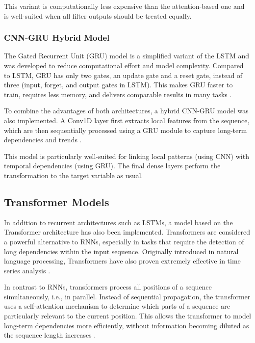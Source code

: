 This variant is computationally less expensive than the attention-based one and is well-suited when all filter outputs should be treated equally.



\subsubsection{CNN-GRU Hybrid Model}

The Gated Recurrent Unit (GRU) model is a simplified variant of the LSTM and was developed to reduce computational effort and model complexity.
Compared to LSTM, GRU has only two gates, an update gate and a reset gate, instead of three (input, forget, and output gates in LSTM).
This makes GRU faster to train, requires less memory, and delivers comparable results in many tasks \cite{gru-basics}.

To combine the advantages of both architectures, a hybrid CNN-GRU model was also implemented.
A Conv1D layer first extracts local features from the sequence, which are then sequentially processed using a GRU module to capture long-term dependencies and trends \cite{cnn-gru}.

This model is particularly well-suited for linking local patterns (using CNN) with temporal dependencies (using GRU).
The final dense layers perform the transformation to the target variable as usual.



\subsection{Transformer Models}

In addition to recurrent architectures such as LSTMs, a model based on the Transformer architecture has also been implemented.
Transformers are considered a powerful alternative to RNNs, especially in tasks that require the detection of long dependencies within the input sequence.
Originally introduced in natural language processing, Transformers have also proven extremely effective in time series analysis \cite{transformer-time-series}.

In contrast to RNNs, transformers process all positions of a sequence simultaneously, i.e., in parallel.
Instead of sequential propagation, the transformer uses a self-attention mechanism to determine which parts of a sequence are particularly relevant to the current position.
This allows the transformer to model long-term dependencies more efficiently, without information becoming diluted as the sequence length increases \cite{cnn-attention}.

